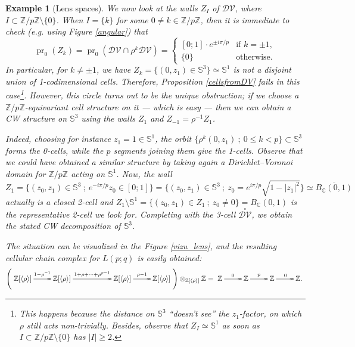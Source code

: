 \documentclass[11pt,twoside]{amsart}
\theoremstyle{plain}
\newtheorem{exemple}[prop]{Example}
\newcommand{\C}{{\mathbb C}}
\newcommand{\Z}{{\mathbb Z}}
\newcommand{\Sph}{\mathbb{S}}
\DeclareMathOperator\pr{pr}
\begin{document}
\begin{exemple}[Lens spaces]
We now look at the walls $Z_I$ of $\mathcal{DV}$, where $I\subset\Z/p\Z\setminus\{0\}$. When $I=\{k\}$ for some $0\ne k\in\Z/p\Z$, then it is immediate to check (e.g. using Figure \ref{angular}) that
\begin{equation}\label{2-walls}
\pr_0(Z_{k})=\pr_0(\mathcal{DV}\cap\rho^k\mathcal{DV})=\left\{\begin{array}{cc}[0;1]\cdot e^{\pm i\pi/p} & \text{if $k=\pm1$}, \\[.5em] \{0\} & \text{otherwise.} \end{array}\right.
\end{equation}
In particular, for $k\ne\pm1$, we have $Z_{k}=\{(0,z_1)\in\Sph^3\}\simeq\Sph^1$ is \emph{not} a disjoint union of 1-codimensional cells. Therefore, Proposition \ref{cellsfromDV} fails in this case\footnote{This happens because the distance on $\Sph^3$ ``doesn't see'' the $z_1$-factor, on which $\rho$ still acts non-trivially. Besides, observe that $Z_I\simeq\Sph^1$ as soon as $I\subset\Z/p\Z\setminus\{0\}$ has $|I|\ge2$.}. However, this circle turns out to be the unique obstruction; if we choose a $\Z/p\Z$-equivariant cell structure on it --- which is easy --- then we can obtain a CW structure on $\Sph^3$ using the walls $Z_1$ and $Z_{-1}=\rho^{-1}Z_1$.

Indeed, choosing for instance $z_1=1\in\Sph^1$, the orbit $\{\rho^k(0,z_1)~;~0\le k<p\}\subset\Sph^3$ forms the 0-cells, while the $p$ segments joining them give the 1-cells. Observe that we could have obtained a similar structure by taking again a Dirichlet--Voronoi domain for $\Z/p\Z$ acting on $\Sph^1$. Now, the wall
\[Z_1=\{(z_0,z_1)\in\Sph^3~;~e^{-i\pi/p}z_0\in[0;1]\}=\{(z_0,z_1)\in\Sph^3~;~z_0=e^{i\pi/p}\sqrt{1-|z_1|^2}\}\simeq\overline{B_\C(0,1)}\]
actually is a closed 2-cell and $Z_1\setminus\Sph^1=\{(z_0,z_1)\in Z_1~;~z_0\ne0\}=B_\C(0,1)$ is the representative 2-cell we look for. Completing with the 3-cell $\stackrel{\circ}{\mathcal{DV}}$, we obtain the stated CW decomposition of $\Sph^3$.

The situation can be visualized in the Figure \ref{vizu_lens}, and the resulting cellular chain complex for $L(p;q)$ is easily obtained:
\[\left(\xymatrix{\Z[\left<\rho\right>]\ar^{1-\rho^{-1}}[r] & \Z[\left<\rho\right>] \ar^{1+\rho+\cdots+\rho^{p-1}}[rr] & & \Z[\left<\rho\right>] \ar^{\rho-1}[r] & \Z[\left<\rho\right>]}\right)\otimes_{\Z[\left<\rho\right>]}\Z=\xymatrix{\Z\ar^0[r] & \Z\ar^p[r] & \Z\ar^0[r] & \Z.}\]

\begin{center}
\begin{figure}%
\end{figure}
\end{center}
\end{exemple}
\end{document}
